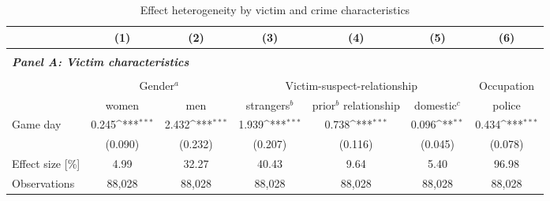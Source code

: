 

\begin{table}[ht] \centering 
	\begin{threeparttable} \centering \caption{Effect heterogeneity by victim and crime characteristics}
		\label{tab_soc_ext:reg_fe_assrate_victim_crime_chars}
		{\def\sym#1{\ifmmode^{#1}\else\(^{#1}\)\fi} 
			\begin{tabular}{l*{6}{c}}
				\toprule 
				&\multicolumn{1}{c}{(1)}&\multicolumn{1}{c}{(2)}&\multicolumn{1}{c}{(3)}&\multicolumn{1}{c}{(4)}&\multicolumn{1}{c}{(5)}&\multicolumn{1}{c}{(6)}\\
				\midrule

				\\
				\multicolumn{6}{l}{\textit{\textbf{Panel A: Victim characteristics}}} \\\\
					& \multicolumn{2}{c}{Gender$^a$} & \multicolumn{3}{c}{Victim-suspect-relationship} & Occupation \\
					\cmidrule(lr){2-3} \cmidrule(lr){4-6} \cmidrule(lr){7-7}
				&  women & men & strangers$^b$ & \clb{c}{prior$^b$\\relationship} & domestic$^c$ & police \\
				\midrule			
				Game day           		 &     0.245\sym{***}&       2.432\sym{***}&       1.939\sym{***}&       0.738\sym{***}&       0.096\sym{**} &       0.434\sym{***}\\
				                    	 &   (0.090)         &     (0.232)         &     (0.207)         &     (0.116)         &     (0.045)         &     (0.078)         \\
				Effect size [\%]&      4.99         &       32.27         &       40.43         &        9.64         &        5.40         &       96.98         \\
				Observations        	 &    88,028         &      88,028         &      88,028         &      88,028         &      88,028         &      88,028         \\
				

\end{tabular}}
\end{threeparttable}
\end{table}
